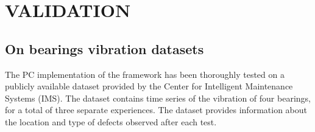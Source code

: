 \section{VALIDATION}
\label{sec:validation}

\subsection{On bearings vibration datasets}

The PC implementation of the framework has been thoroughly tested on a publicly available dataset provided by the Center for Intelligent Maintenance Systems (IMS).
The dataset contains time series of the vibration of four bearings, for a total of three separate  experiences. The dataset provides information about the location and type of defects observed after each test.

